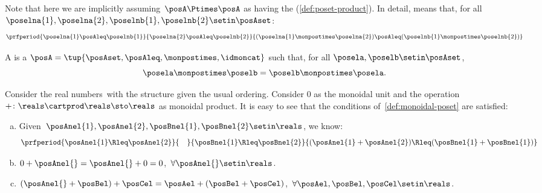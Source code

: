 Note that here we are implicitly assuming~$\posA \Ptimes \posA$ as having the  (\cref{def:poset-product}).
In detail,  means that, for all~$\poselna{1}, \poselna{2}, \poselnb{1}, \poselnb{2} \setin \posAset$:
\begin{equation}
    \prfperiod{
        \poselna{1} \posAleq \poselnb{1}}{\poselna{2} \posAleq \poselnb{2}}{ (\poselna{1} \monpostimes  \poselna{2}) \posAleq  (\poselnb{1} \monpostimes  \poselnb{2})}
\end{equation}

\begin{ctdefinition}
    \label{def:sym-monoidal-poset}
    A  is a  $\posA=\tup{\posAset, \posAleq, {\monpostimes}, \idmoncat}$ such that, for all $\posela, \poselb \setin \posAset$,
    \begin{equation}
        \posela \monpostimes \poselb = \poselb \monpostimes \posela.
    \end{equation}
\end{ctdefinition}

\begin{example}
    \label{ex:monoidal-pos-reals}
    Consider the real numbers~\reals with the  structure given the usual ordering.
    Consider 0 as the monoidal unit and the operation~$+\colon \reals\cartprod \reals\sto \reals$ as monoidal product.
    It is easy to see that the conditions of~\cref{def:monoidal-poset} are satisfied:
    \begin{enumerate}[(a)]
        \item Given~$\posAnel{1},\posAnel{2},\posBnel{1},\posBnel{2}\setin \reals$, we know:
              \begin{equation}
                  \prfperiod{
                      \posAnel{1}\Rleq  \posAnel{2}
                  }{\quad}{
                      \posBnel{1}\Rleq  \posBnel{2}
                  }{
                      (\posAnel{1}+\posAnel{2}) \Rleq  (\posBnel{1}+\posBnel{1})
                  }
              \end{equation}
        \item $0+\posAnel{}=\posAnel{}+0=0$,~$\forall \posAnel{}\setin \reals$.
        \item $(\posAnel{}+\posBel)+\posCel=\posAel+(\posBel+\posCel)$,~$\forall \posAel,\posBel,\posCel\setin \reals$.
    \end{enumerate}
\end{example}

